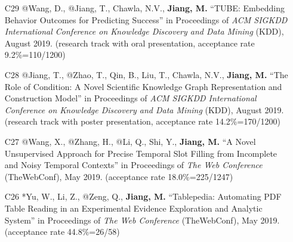 \documentclass[10pt]{article}
\newenvironment{myindentpar}[1]%
{\begin{list}{}%
         {\setlength{\leftmargin}{#1}}%
         \item[]%
}
{\end{list}}
\newcounter{list}
\newcommand{\hide}[1]{}
\begin{document}
\begin{myindentpar}{0.00cm}
\begin{enumerate}[leftmargin=.5cm]
\item[C29] @Wang, D., @Jiang, T., Chawla, N.V., \textbf{Jiang, M.} ``TUBE: Embedding Behavior Outcomes for Predicting Success'' in Proceedings of \emph{ACM SIGKDD International Conference on Knowledge Discovery and Data Mining} (KDD), August 2019. (research track with oral presentation, acceptance rate 9.2\%=110/1200)

	\hide{\vspace{-0.1cm}\hspace{0.5cm}{\small \emph{I made 30\% contribution and Mr. Wang made 60\%. I conceived the idea. Mr. Wang designed the study, implemented the system, and did the experiments. I wrote the introduction and part of method sections. Mr. Wang wrote the rest of the paper.}}}

\item[C28] @Jiang, T., @Zhao, T., Qin, B., Liu, T., Chawla, N.V., \textbf{Jiang, M.} ``The Role of Condition: A Novel Scientific Knowledge Graph Representation and Construction Model'' in Proceedings of \emph{ACM SIGKDD International Conference on Knowledge Discovery and Data Mining} (KDD), August 2019. (research track with poster presentation, acceptance rate 14.2\%=170/1200)

	\hide{\vspace{-0.1cm}\hspace{0.5cm}{\small \emph{I made 30\% contribution and Mr. Jiang made 60\%. I conceived the idea. Mr. Jiang designed the study, implemented the system, and did the experiments. I wrote the introduction. Mr. Jiang wrote the rest of the paper.}}}

\item[C27] @Wang, X., @Zhang, H., @Li, Q., Shi, Y., \textbf{Jiang, M.} ``A Novel Unsupervised Approach for Precise Temporal Slot Filling from Incomplete and Noisy Temporal Contexts'' in Proceedings of \emph{The Web Conference} (TheWebConf), May 2019. (acceptance rate 18.0\%=225/1247)

	\hide{\vspace{-0.1cm}\hspace{0.5cm}{\small \emph{I made 75\% contribution and Ms. Wang made 20\%. I conceived the idea, designed the study, and implemented the system. Ms. Wang did the experiments. Ms. Wang and I wrote the paper.}}}

\item[C26] *Yu, W., Li, Z., @Zeng, Q., \textbf{Jiang, M.} ``Tablepedia: Automating PDF Table Reading in an Experimental Evidence Exploration and Analytic System'' in Proceedings of \emph{The Web Conference} (TheWebConf), May 2019. (acceptance rate 44.8\%=26/58)


\end{enumerate}
\end{myindentpar}
\end{document}
